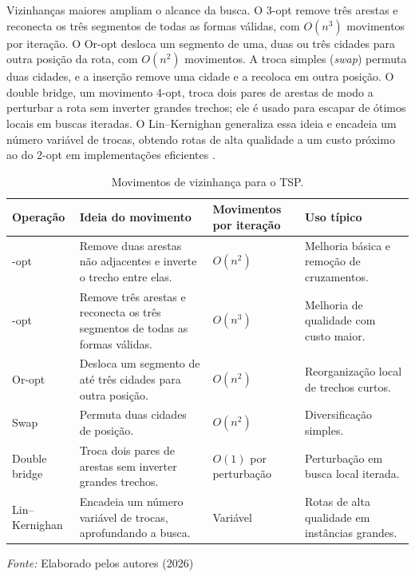 Vizinhanças maiores ampliam o alcance da busca. O 3-opt remove três arestas e reconecta os três segmentos de todas as formas válidas, com $O(n^3)$ movimentos por iteração. O Or-opt desloca um segmento de uma, duas ou três cidades para outra posição da rota, com $O(n^2)$ movimentos. A troca simples (\textit{swap}) permuta duas cidades, e a inserção remove uma cidade e a recoloca em outra posição. O double bridge, um movimento 4-opt, troca dois pares de arestas de modo a perturbar a rota sem inverter grandes trechos; ele é usado para escapar de ótimos locais em buscas iteradas. O Lin--Kernighan \cite{lin1973} generaliza essa ideia e encadeia um número variável de trocas, obtendo rotas de alta qualidade a um custo próximo ao do 2-opt em implementações eficientes \cite{helsgaun2000, rego2011}.

\begin{table}[htb]
\centering
\caption{Movimentos de vizinhança para o TSP.}
\label{tab:movimentos-tsp}
\small
\renewcommand{\arraystretch}{1.2}
\begin{tabular}{|>{\raggedright\arraybackslash}p{2.6cm}|>{\raggedright\arraybackslash}p{5.6cm}|>{\raggedright\arraybackslash}p{2.4cm}|>{\raggedright\arraybackslash}p{3.0cm}|}
\hline
\rowcolor{gray!20}
\textbf{Operação} & \textbf{Ideia do movimento} & \textbf{Movimentos por iteração} & \textbf{Uso típico} \\ \hline
2-opt & Remove duas arestas não adjacentes e inverte o trecho entre elas. & $O(n^2)$ & Melhoria básica e remoção de cruzamentos. \\ \hline
3-opt & Remove três arestas e reconecta os três segmentos de todas as formas válidas. & $O(n^3)$ & Melhoria de qualidade com custo maior. \\ \hline
Or-opt & Desloca um segmento de até três cidades para outra posição. & $O(n^2)$ & Reorganização local de trechos curtos. \\ \hline
Swap & Permuta duas cidades de posição. & $O(n^2)$ & Diversificação simples. \\ \hline
Double bridge & Troca dois pares de arestas sem inverter grandes trechos. & $O(1)$ por perturbação & Perturbação em busca local iterada. \\ \hline
Lin--Kernighan & Encadeia um número variável de trocas, aprofundando a busca. & Variável & Rotas de alta qualidade em instâncias grandes. \\ \hline
\end{tabular}

\footnotesize{\textit{Fonte:} Elaborado pelos autores (2026)}
\end{table}

